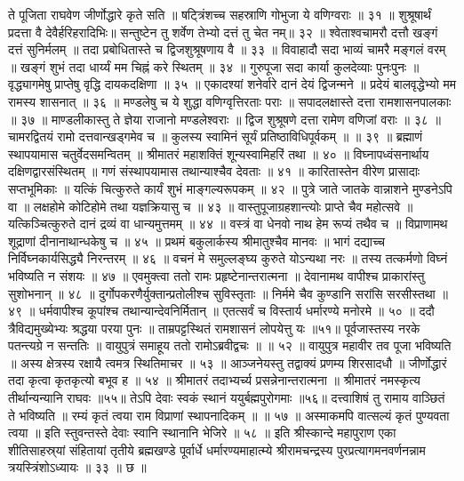 ते पूजिता राघवेण जीर्णोद्धारे कृते सति ॥
षट्त्रिंशच्च सहस्राणि गोभुजा ये वणिग्वराः ॥ ३१ ॥
शुश्रूषार्थं प्रदत्ता वै देवैर्हरिहरादिभिः॥
सन्तुष्टेन तु शर्वेण तेभ्यो दत्तं तु चेत नम्॥ ३२ ॥
श्वेताश्वचामरौ दत्तौ खङ्गं दत्तं सुनिर्मलम् ॥
तदा प्रबोधितास्ते च द्विजशुश्रूषणाय वै ॥ ३३ ॥
विवाहादौ सदा भाव्यं चामरै मङ्गलं वरम् ॥
खङ्गं शुभं तदा धार्य्यं मम चिह्नं करे स्थितम् ॥ ३४ ॥
गुरुपूजा सदा कार्या कुलदेव्याः पुनःपुनः ॥
वृद्ध्यागमेषु प्राप्तेषु वृद्धि दायकदक्षिणा ॥ ३५ ॥
एकादश्यां शनेर्वारे दानं देयं द्विजन्मने ॥
प्रदेयं बालवृद्धेभ्यो मम रामस्य शासनात् ॥ ३६ ॥
मण्डलेषु च ये शुद्धा वणिग्वृत्तिरताः पराः ॥
सपादलक्षास्ते दत्ता रामशासनपालकाः ॥ ३७ ॥
माण्डलीकास्तु ते ज्ञेया राजानो मण्डलेश्वराः ॥
द्विज शुश्रूषणे दत्ता रामेण वणिजां वराः ॥ ३८ ॥
चामरद्वितयं रामो दत्तवान्खड्गमेव च ॥
कुलस्य स्वामिनं सूर्यं प्रतिष्ठाविधिपूर्वकम् ॥ ॥ ३९ ॥
ब्रह्माणं स्थापयामास चतुर्वेदसमन्वितम् ॥
श्रीमातरं महाशक्तिं शून्यस्वामिहरिं तथा ॥ ४० ॥
विघ्नापध्वंसनार्थाय दक्षिणद्वारसंस्थितम् ॥
गणं संस्थापयामास तथान्याश्चैव देवताः ॥ ४१ ॥
कारितास्तेन वीरेण प्रासादाः सप्तभूमिकाः ॥
यत्किं चित्कुरुते कार्यं शुभं माङ्गल्यरूपकम् ॥ ४२ ॥
पुत्रे जाते जातके वान्नाशने मुण्डनेऽपि वा ॥
लक्षहोमे कोटिहोमे तथा यज्ञक्रियासु च ॥ ४३ ॥
वास्तुपूजाग्रहशान्त्योः प्राप्ते चैव महोत्सवे ॥
यत्किञ्चित्कुरुते दानं द्रव्यं वा धान्यमुत्तमम् ॥ ४४ ॥
वस्त्रं वा धेनवो नाथ हेम रूप्यं तथैव च ॥
विप्राणामथ शूद्राणां दीनानाथान्धकेषु च ॥ ४५ ॥
प्रथमं बकुलार्कस्य श्रीमातुश्चैव मानवः ॥
भागं दद्याच्च निर्विघ्नकार्यसिद्ध्यै निरन्तरम् ॥ ४६ ॥
वचनं मे समुल्लङ्घ्य कुरुते योऽन्यथा नरः ॥
तस्य तत्कर्मणो विघ्नं भविष्यति न संशयः ॥ ४७ ॥
एवमुक्त्वा ततो रामः प्रहृष्टेनान्तरात्मना ॥
देवानामथ वापीश्च प्राकारांस्तु सुशोभनान् ॥ ४८ ॥
दुर्गोपकरणैर्युक्तान्प्रतोलीश्च सुविस्तृताः ॥
निर्ममे चैव कुण्डानि सरांसि सरसीस्तथा ॥ ४९ ॥
धर्मवापीश्च कूपांश्च तथान्यान्देवनिर्मितान् ॥
एतत्सर्वं च विस्तार्य धर्मारण्ये मनोरमे ॥ ५० ॥
ददौ त्रैविद्यमुख्येभ्यः श्रद्धया परया पुनः ॥
ताम्रपट्टस्थितं रामशासनं लोपयेत्तु यः ॥५१॥
पूर्वजास्तस्य नरके पतन्त्यग्रे न सन्ततिः ॥
वायुपुत्रं समाहूय ततो रामोऽब्रवीद्वचः ॥ ॥ ५२ ॥
वायुपुत्र महावीर तव पूजा भविष्यति ॥
अस्य क्षेत्रस्य रक्षायै त्वमत्र स्थितिमाचर ॥ ५३ ॥
आञ्जनेयस्तु तद्वाक्यं प्रणम्य शिरसादधौ ॥
जीर्णोद्धारं तदा कृत्वा कृतकृत्यो बभूव ह ॥ ५४ ॥
श्रीमातरं तदाभ्यर्च्य प्रसन्नेनान्तरात्मना ॥
श्रीमातरं नमस्कृत्य तीर्थान्यन्यानि राघवः ॥५५॥
तेऽपि देवाः स्वकं स्थानं ययुर्बह्मपुरोगमाः ॥५६॥
दत्त्वाशिषं तु रामाय वाञ्छितं ते भविष्यति ॥
रम्यं कृतं त्वया राम विप्राणां स्थापनादिकम् ॥ ॥ ५७ ॥
अस्माकमपि वात्सल्यं कृतं पुण्यवता त्वया ॥
इति स्तुवन्तस्ते देवाः स्वानि स्थानानि भेजिरे ॥ ५८ ॥
इति श्रीस्कान्दे महापुराण एका शीतिसाहस्र्यां संहितायां तृतीये ब्रह्मखण्डे पूर्वार्धे धर्मारण्यमाहात्म्ये श्रीरामचन्द्रस्य पुरप्रत्यागमनवर्णनन्नाम त्रयस्त्रिंशोऽध्यायः ॥ ३३ ॥ छ ॥


